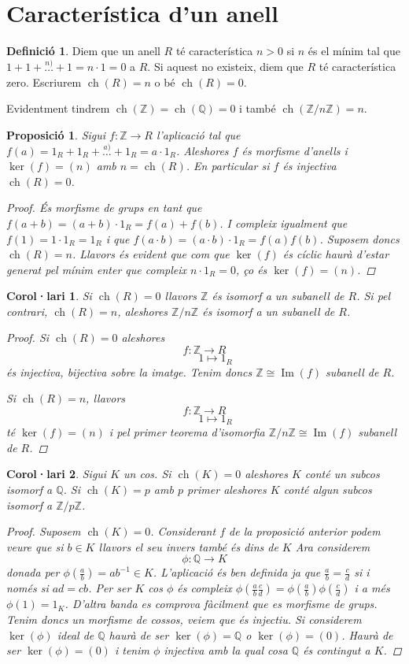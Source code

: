 \documentclass[a4paper,11pt]{report}
\newcommand{\inv}[1]{#1^{-1}}
\newcommand{\zn}{\mathbb{Z}/n\mathbb{Z}}
\DeclareMathOperator{\ch}{ch}
\theoremstyle{theorem}
\newtheorem{proposicio}{\normalfont \sffamily\bfseries Proposició}[section]
\newtheorem{col}{\normalfont \sffamily\bfseries Corol·lari}[section]
\theoremstyle{definition}
\newtheorem{definicio}{\normalfont\sffamily\bfseries Definició}[section]
\DeclareMathOperator{\ima}{Im}
\begin{document}
\section{Característica d'un anell}
\begin{definicio}
	Diem que un anell $R$ té característica $n>0$ si $n$ és el mínim tal que $1+1+\stackrel{n)}\ldots+1=n\cdot 1=0$ a $R$. Si aquest no existeix, diem que $R$ té característica zero. Escriurem $\ch(R)=n$ o bé $\ch(R)=0$.
\end{definicio}
Evidentment tindrem $\ch(\mathbb{Z})=\ch(\mathbb{Q})=0$ i també $ \ch(\zn)=n$.
\begin{proposicio}
	Sigui $f:\mathbb{Z}\longrightarrow R$ l'aplicació tal que $f(a)=1_R+1_R+\stackrel{a)}\ldots+1_R=a\cdot 1_R$. Aleshores $f$ és morfisme d'anells i $\ker(f)=(n)$ amb $n=\ch(R)$. En particular si $f$ és injectiva $\ch(R)=0$.\begin{proof}
		És morfisme de grups en tant que
		$f(a+b)=(a+b)\cdot 1_R=f(a)+f(b)$. I compleix igualment que $f(1)=1\cdot 1_R=1_R$ i que $f(a\cdot b)=(a\cdot b)\cdot 1_R=f(a)f(b)$.
		Suposem doncs $\ch(R)=n$. Llavors és evident que com que $\ker(f)$ és cíclic haurà d'estar generat pel mínim enter que compleix $n\cdot 1_R=0$, ço és $\ker(f)=(n)$.
		
	\end{proof}
\end{proposicio}
\begin{col}
	Si $\ch(R)=0$ llavors $\mathbb{Z}$ és isomorf a un subanell de $R$. Si pel contrari, $\ch(R)=n$, aleshores $\zn$ és isomorf a un subanell de $R$.
	\begin{proof}
		Si $\ch(R)=0$ aleshores $$f:\mathbb{Z}\longrightarrow R$$ $$\qquad 1\longmapsto 1_R$$ és injectiva, bijectiva sobre la imatge. Tenim doncs $\mathbb{Z}\cong \ima(f)$ subanell de $R$.
		
		Si $\ch(R)=n$, llavors $$f:\mathbb{Z}\longrightarrow R$$ $$\qquad 1\longmapsto 1_R$$ té $\ker(f)=(n)$ i pel primer teorema d'isomorfia $\zn\cong \ima(f)$ subanell de $R$.
	\end{proof}
\end{col}
\begin{col}
Sigui $K$ un cos. Si $\ch(K)=0$ aleshores $K$ conté un subcos isomorf a $\mathbb{Q}$. Si $\ch(K)=p$ amb $p$ primer aleshores $K$ conté algun subcos isomorf a $\mathbb{Z}/p\mathbb{Z}$.
\begin{proof}
Suposem $\ch(K)=0$. Considerant $f$ de la proposició anterior podem veure que si $b\in K$ llavors el seu invers també és dins de $K$ Ara considerem $$\phi:\mathbb{Q}\longrightarrow K$$ donada per $\phi(\tfrac{a}{b})=a\inv{b}\in K$. L'aplicació és ben definida ja que $\tfrac{a}{b}=\tfrac{c}{d}$ si i només si $ad=cb$.  Per ser $K$ cos $\phi$ és compleix $\phi(\tfrac{a}{b}\tfrac{c}{d})=\phi(\tfrac{a}{b})\phi(\tfrac{c}{d})$ i a més $\phi(1)=1_K$. D'altra banda es comprova fàcilment que es morfisme de grups. Tenim doncs un morfisme de cossos, veiem que és injectiu. Si considerem $\ker(\phi)$ ideal de $\mathbb{Q}$ haurà de ser $\ker(\phi)=\mathbb{Q}$ o $\ker(\phi)=(0)$. Haurà de ser $\ker(\phi)=(0)$ i tenim $\phi$ injectiva amb la qual cosa $\mathbb{Q}$ és contingut a $K$.
\end{proof}
\end{col}
\end{document}
